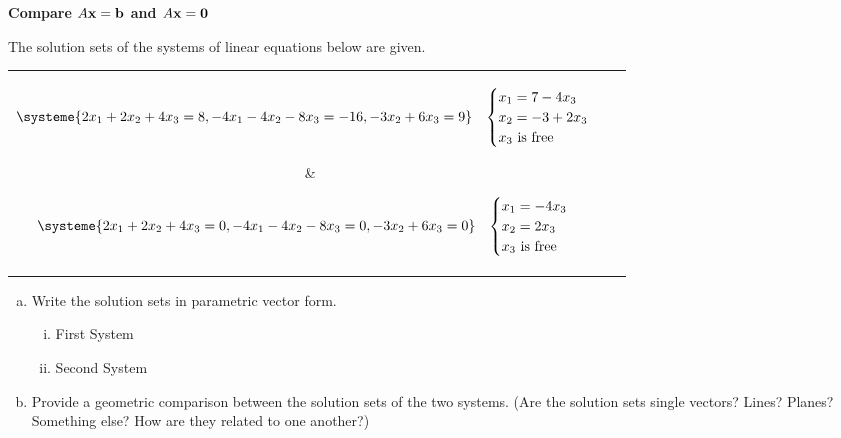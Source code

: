 \newpage


\begin{exercise} %
	\textbf{Compare $A\boldsymbol{\mathbf{x}}=\boldsymbol{\mathbf{b}}$ and $A\boldsymbol{\mathbf{x}}=\boldsymbol{\mathbf{0}}$} \par
	The solution sets of the systems of linear equations below are given.
	
	\noindent	
	\begin{tabular}{c|c}
		\parbox{0.5\linewidth}{%
			\begin{align*}
			\systeme{2x_1+2x_2+4x_3=8,-4x_1-4x_2-8x_3=-16,-3x_2+6x_3=9}&&
			\begin{cases}x_1 = 7-4x_3 \\ x_2 =-3+2x_3 \\ x_3 \text{ is free}\end{cases}
			\end{align*}}
		&
		\parbox{0.5\linewidth}{%
			\begin{align*}
			\systeme{2x_1+2x_2+4x_3=0,-4x_1-4x_2-8x_3=0,-3x_2+6x_3=0}&&
			\begin{cases}x_1 = -4x_3 \\ x_2 =2x_3 \\ x_3 \text{ is free}\end{cases}
			\end{align*}}
	\end{tabular}
	
	\begin{enumerate}[(a)]
		\item Write the solution sets in parametric vector form.
		\begin{multicols}{2}
			\begin{enumerate}[(i)]
				\item First System
				\item Second System
			\end{enumerate}
		\end{multicols}
		\vfill
		\item Provide a geometric comparison between the solution sets of the two systems. (Are the solution sets single vectors? Lines? Planes? Something else? How are they related to one another?)
		\vspace{1in}
	\end{enumerate}
\end{exercise}

